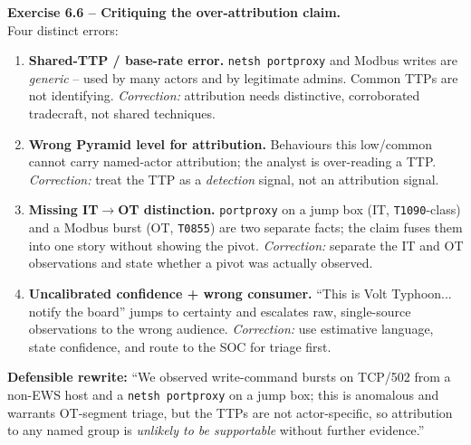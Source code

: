 \documentclass[11pt,a4paper]{article}
\begin{document}
\begin{solutionbox}
\textbf{Exercise 6.6 -- Critiquing the over-attribution claim.}\\
Four distinct errors:
\begin{enumerate}\setlength{\itemsep}{1pt}
  \item \textbf{Shared-TTP / base-rate error.} \texttt{netsh portproxy} and Modbus writes are
        \emph{generic} -- used by many actors and by legitimate admins. Common TTPs are not
        identifying. \emph{Correction:} attribution needs distinctive, corroborated tradecraft,
        not shared techniques.
  \item \textbf{Wrong Pyramid level for attribution.} Behaviours this low/common cannot carry
        named-actor attribution; the analyst is over-reading a TTP. \emph{Correction:} treat
        the TTP as a \emph{detection} signal, not an attribution signal.
  \item \textbf{Missing IT$\to$OT distinction.} \texttt{portproxy} on a jump box (IT,
        \texttt{T1090}-class) and a Modbus burst (OT, \texttt{T0855}) are two separate facts;
        the claim fuses them into one story without showing the pivot. \emph{Correction:}
        separate the IT and OT observations and state whether a pivot was actually observed.
  \item \textbf{Uncalibrated confidence + wrong consumer.} ``This is Volt Typhoon... notify the
        board'' jumps to certainty and escalates raw, single-source observations to the wrong
        audience. \emph{Correction:} use estimative language, state confidence, and route to the
        SOC for triage first.
\end{enumerate}
\textbf{Defensible rewrite:} ``We observed write-command bursts on TCP/502 from a non-EWS host
and a \texttt{netsh portproxy} on a jump box; this is anomalous and warrants OT-segment triage,
but the TTPs are not actor-specific, so attribution to any named group is \emph{unlikely to be
supportable} without further evidence.''
\end{solutionbox}
\end{document}
